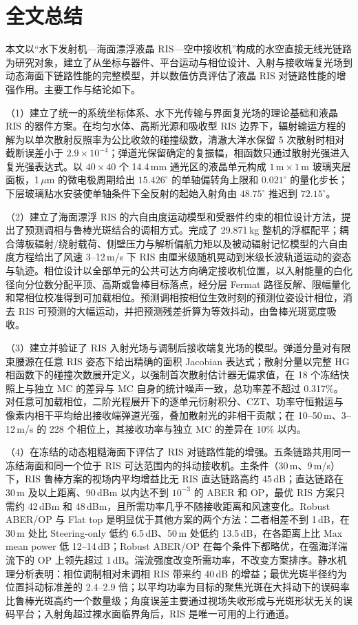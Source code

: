 \chapter{全文总结}
\label{chap:conclusion}

本文以“水下发射机—海面漂浮液晶 RIS—空中接收机”构成的水空直接无线光链路为研究对象，建立了从坐标与器件、平台运动与相位设计、入射与接收端复光场到动态海面下链路性能的完整模型，并以数值仿真评估了液晶 RIS 对链路性能的增强作用。主要工作与结论如下。

（1）建立了统一的系统坐标体系、水下光传输与界面复光场的理论基础和液晶 RIS 的器件方案。在均匀水体、高斯光源和吸收型 RIS 边界下，辐射输运方程的解为以单次散射反照率为公比收敛的碰撞级数，清澈大洋水保留 5 次散射时相对截断误差小于 $2.9\times10^{-4}$；弹道光保留确定的复振幅，相函数只通过散射光强进入复光强表达式。以 $40\times40$ 个 14.4\,mm 通光区的液晶单元构成 $1\,\mathrm m\times1\,\mathrm m$ 玻璃夹层面板，1\,$\mu$m 的微电极周期给出 $15.426^\circ$ 的单轴偏转角上限和 $0.021^\circ$ 的量化步长；下层玻璃贴水安装使单轴条件下全反射的起始入射角由 $48.75^\circ$ 推迟到 $72.15^\circ$。

（2）建立了海面漂浮 RIS 的六自由度运动模型和受器件约束的相位设计方法，提出了预测调相与鲁棒光斑结合的调相方式。完成了 29.871\,kg 整机的浮框配平；耦合薄板辐射/绕射载荷、侧壁压力与解析偏航力矩以及被动辐射记忆模型的六自由度方程给出了风速 3--12\,m/s 下 RIS 由厘米级随机晃动到米级长波轨道运动的姿态与轨迹。相位设计以全部单元的公共可达方向确定接收机位置，以入射能量的白化径向分位数分配平顶、高斯或鲁棒目标落点，经分层 Fermat 路径反解、限幅量化和常相位校准得到可加载相位。预测调相按相位生效时刻的预测位姿设计相位，消去 RIS 可预测的大幅运动，并把预测残差折算为等效抖动，由鲁棒光斑宽度吸收。

（3）建立并验证了 RIS 入射光场与调制后接收端复光场的模型。弹道分量对有限束腰源在任意 RIS 姿态下给出精确的面积 Jacobian 表达式；散射分量以完整 HG 相函数下的碰撞次数展开定义，以强制首次散射估计器无偏求值，在 18 个冻结快照上与独立 MC 的差异与 MC 自身的统计噪声一致，总功率差不超过 0.317\%。对任意可加载相位，二阶光程展开下的逐单元衍射积分、CZT、功率守恒搬运与像素内相干平均给出接收端弹道光强，叠加散射光的非相干贡献；在 10--50\,m、3--12\,m/s 的 228 个相位上，其接收功率与独立 MC 的差异在 10\% 以内。

（4）在冻结的动态粗糙海面下评估了 RIS 对链路性能的增强。五条链路共用同一冻结海面和同一个位于 RIS 可达范围内的抖动接收机。主条件（30\,m、9\,m/s）下，RIS 鲁棒方案的视场内平均增益比无 RIS 直达链路高约 45\,dB；直达链路在 30\,m 及以上距离、90\,dBm 以内达不到 $10^{-3}$ 的 ABER 和 OP，最优 RIS 方案只需约 42\,dBm 和 48\,dBm，且所需功率几乎不随接收距离和风速变化。Robust ABER/OP 与 Flat top 是明显优于其他方案的两个方法：二者相差不到 1\,dB，在 30\,m 处比 Steering-only 低约 6.5\,dB、50\,m 处低约 13.5\,dB，在各距离上比 Max mean power 低 12--14\,dB；Robust ABER/OP 在每个条件下都略优，在强海洋湍流下的 OP 上领先超过 1\,dB。湍流强度改变所需功率，不改变方案排序。静水机理分析表明：相位调制相对未调相 RIS 带来约 40\,dB 的增益；最优光斑半径约为位置抖动标准差的 2.4--2.9 倍；以平均功率为目标的聚焦光斑在大抖动下的误码率比鲁棒光斑高约一个数量级；角度误差主要通过视场失收形成与光斑形状无关的误码平台；入射角超过裸水面临界角后，RIS 是唯一可用的上行通道。

